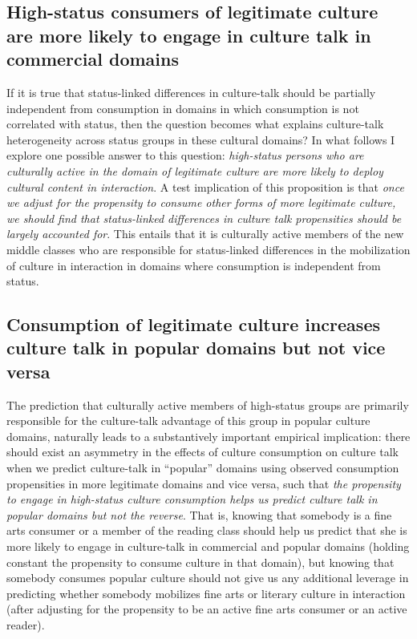 \subsection{High-status consumers of legitimate culture are more likely to engage in culture talk in commercial domains}
If it is true that status-linked differences in culture-talk should be partially independent from consumption in domains in which consumption is not correlated with status, then the question becomes what explains culture-talk heterogeneity across status groups in these cultural domains?  In what follows I explore one possible answer to this question: \emph{high-status persons who are culturally active in the domain of legitimate culture are more likely to deploy cultural content in interaction}. A test implication of this proposition is that \emph{once we adjust for the propensity to consume other forms of more legitimate culture, we should find that status-linked differences in culture talk propensities should be largely accounted for}.  This entails that it is culturally active members of the new middle classes who are responsible for status-linked differences in the mobilization of culture in interaction in domains where consumption is independent from status.  

\subsection{Consumption of legitimate culture increases culture talk in popular domains but not vice versa}
The prediction that culturally active members of high-status groups are primarily responsible for the culture-talk advantage of this group in popular culture domains, naturally leads to a substantively important empirical implication: there should exist an asymmetry in the effects of culture consumption on culture talk when we predict culture-talk in ``popular'' domains using observed consumption propensities in more legitimate domains and vice versa, such that \emph{the propensity to engage in high-status culture consumption helps us predict culture talk in popular domains but not the reverse}. That is, knowing that somebody is a fine arts consumer or a member of the reading class should help us predict that she is more likely to engage in culture-talk in commercial and popular domains (holding constant the propensity to consume culture in that domain), but knowing that somebody consumes popular culture should not give us any additional leverage in predicting whether somebody mobilizes fine arts or literary culture in interaction (after adjusting for the propensity to be an active fine arts consumer or an active reader). 
